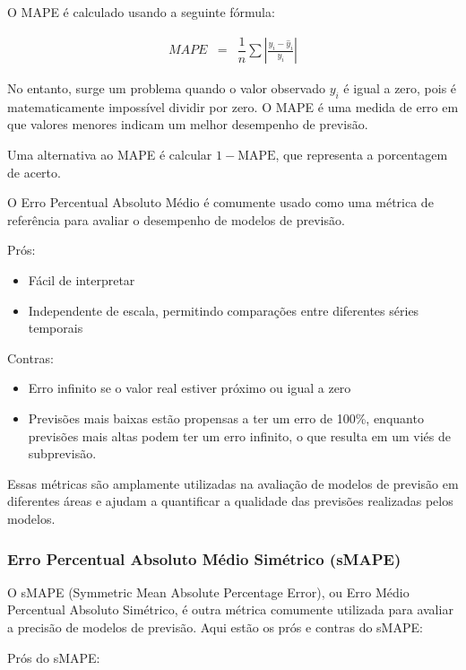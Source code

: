 O MAPE é calculado usando a seguinte fórmula:

\begin{eqnarray}
	MAPE &=& \dfrac{1}{n} \sum\left|\frac{y_i - \hat{y}_i}{y_i}\right|\label{eq:mape}
\end{eqnarray}

No entanto, surge um problema quando o valor observado $y_i$ é igual a zero, pois é matematicamente impossível dividir por zero. O MAPE é uma medida de erro em que valores menores indicam um melhor desempenho de previsão.

Uma alternativa ao MAPE é calcular $1 - \text{MAPE}$, que representa a porcentagem de acerto.

O Erro Percentual Absoluto Médio é comumente usado como uma métrica de referência para avaliar o desempenho de modelos de previsão.

Prós:

\begin{itemize}
	\item Fácil de interpretar
	\item Independente de escala, permitindo comparações entre diferentes séries temporais
\end{itemize}

Contras:

\begin{itemize}
	\item Erro infinito se o valor real estiver próximo ou igual a zero
	\item Previsões mais baixas estão propensas a ter um erro de 100\%, enquanto previsões mais altas podem ter um erro infinito, o que resulta em um viés de subprevisão.
\end{itemize}

Essas métricas são amplamente utilizadas na avaliação de modelos de previsão em diferentes áreas e ajudam a quantificar a qualidade das previsões realizadas pelos modelos.

\subsubsection{Erro Percentual Absoluto M\'edio Sim\'etrico (sMAPE)}


O sMAPE (Symmetric Mean Absolute Percentage Error), ou Erro Médio Percentual Absoluto Simétrico, é outra métrica comumente utilizada para avaliar a precisão de modelos de previsão. Aqui estão os prós e contras do sMAPE:

Prós do sMAPE:

